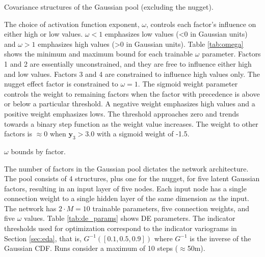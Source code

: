 
\begin{table}[!htb]
    \centering
    \caption{Covariance structures of the Gaussian pool (excluding the nugget).}
    \resizebox{0.9\width}{!}{}
    \label{tab:pool}
\end{table}

The choice of activation function exponent, $\omega$, controls each factor's influence on either high or low values. $\omega < 1$ emphasizes low values (<0 in Gaussian units) and $\omega > 1$ emphasizes high values (>0 in Gaussian units). Table \ref{tab:omega} shows the minimum and maximum bound for each trainable $\omega$ parameter. Factors 1 and 2 are essentially unconstrained, and they are free to influence either high and low values. Factors 3 and 4 are constrained to influence high values only. The nugget effect factor is constrained to $\omega=1$. The sigmoid weight parameter controls the weight to remaining factors when the factor with precedence is above or below a particular threshold. A negative weight emphasizes high values and a positive weight emphasizes lows. The threshold approaches zero and trends towards a binary step function as the weight value increases. The weight to other factors is $\approx 0$ when $\mathbf{y}_{3} > 3.0$ with a sigmoid weight of -1.5.

\begin{table}[!htb]
    \centering
    \caption{$\omega$ bounds by factor.}
    \resizebox{0.9\width}{!}{}
    \label{tab:omega}
\end{table}

The number of factors in the Gaussian pool dictates the network architecture. The pool consists of 4 structures, plus one for the nugget, for five latent Gaussian factors, resulting in an input layer of five nodes. Each input node has a single connection weight to a single hidden layer of the same dimension as the input. The network has $2 \cdot M = 10$ trainable parameters, five connection weights, and five $\omega$ values. Table \ref{tab:de_params} shows \gls{DE} parameters. The indicator thresholds used for optimization correspond to the indicator variograms in Section \ref{sec:eda}, that is, $G^{-1}([0.1, 0.5, 0.9])$ where $G^{-1}$ is the inverse of the Gaussian \gls{CDF}. Runs consider a maximum of 10 steps ($\approx$50m).

